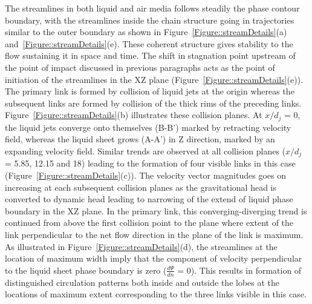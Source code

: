 \documentclass[%
aip,
sd,%
amsmath,amssymb,
preprint,%
author-year,%
]{revtex4-1}
\begin{document}
The streamlines in both liquid and air media follows steadily the phase contour boundary, with the streamlines inside the chain structure going in trajectories similar to the outer boundary as shown in Figure~\ref{Figure::streamDetails}(a) and~\ref{Figure::streamDetails}(e). These coherent structure gives stability to the flow sustaining it in space and time. The shift in stagnation point upstream of the point of impact discussed in previous paragraphs acts as the point of initiation of the streamlines in the XZ plane (Figure~\ref{Figure::streamDetails}(e)). The primary link is formed by collision of liquid jets at the origin whereas the subsequent links are formed by collision of the thick rims of the preceding links. Figure~\ref{Figure::streamDetails}(b) illustrates these collision planes. At $x/d_j$ = 0, the liquid jets converge onto themselves (B-B') marked by retracting velocity field, whereas the liquid sheet grows (A-A') in Z direction, marked by an expanding velocity field. Similar trends are observed at all collision planes ($x/d_j$ = 5.85, 12.15 and 18) leading to the formation of four visible links in this case (Figure~\ref{Figure::streamDetails}(c)). The velocity vector magnitudes goes on increasing at each subsequent collision planes as the gravitational head is converted to dynamic head leading to narrowing of the extend of liquid phase boundary in the XZ plane. In the primary link, this converging-diverging trend is continued from above the first collision point to the plane where extent of the link perpendicular to the net flow direction in the plane of the link is maximum. As illustrated in Figure~\ref{Figure::streamDetails}(d), the streamlines at the location of maximum width imply that the component of velocity perpendicular to the liquid sheet phase boundary is zero ($\frac{d\Psi}{dn}$ = 0). This results in formation of distinguished circulation patterns both inside and outside the lobes at the locations of maximum extent corresponding to the three links visible in this case. \\
\end{document}

